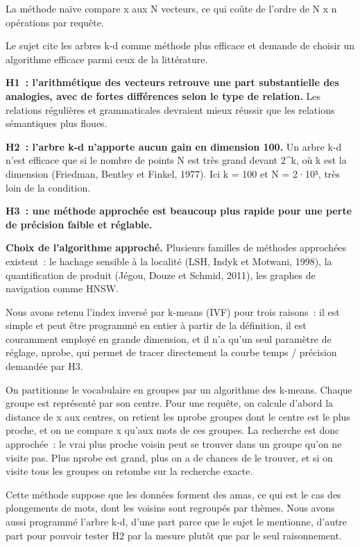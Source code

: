 \documentclass[11pt,a4paper]{article}
\begin{document}
La méthode naïve compare x aux N vecteurs, ce qui coûte de l’ordre de N x n opérations par requête.

Le sujet cite les arbres k-d comme méthode plus efficace et demande de choisir un algorithme efficace parmi ceux de la littérature.

\textbf{H1~: l’arithmétique des vecteurs retrouve une part substantielle des analogies, avec de fortes différences selon le type de relation.} Les relations régulières et grammaticales devraient mieux réussir que les relations sémantiques plus floues.

\textbf{H2~: l’arbre k-d n’apporte aucun gain en dimension 100.} Un arbre k-d n’est efficace que si le nombre de points N est très grand devant 2\textasciicircum{}k, où k est la dimension (Friedman, Bentley et Finkel, 1977). Ici k = 100 et N = 2·10⁵, très loin de la condition.

\textbf{H3~: une méthode approchée est beaucoup plus rapide pour une perte de précision faible et réglable.}\nopagebreak

\textbf{Choix de l’algorithme approché.} Plusieurs familles de méthodes approchées existent~: le hachage sensible à la localité (LSH, Indyk et Motwani, 1998), la quantification de produit (Jégou, Douze et Schmid, 2011), les graphes de navigation comme HNSW.

Nous avons retenu l’index inversé par k-means (IVF) pour trois raisons~: il est simple et peut être programmé en entier à partir de la définition, il est couramment employé en grande dimension, et il n’a qu’un seul paramètre de réglage, nprobe, qui permet de tracer directement la courbe temps / précision demandée par H3.

On partitionne le vocabulaire en groupes par un algorithme des k-means. Chaque groupe est représenté par son centre. Pour une requête, on calcule d’abord la distance de x aux centres, on retient les nprobe groupes dont le centre est le plus proche, et on ne compare x qu’aux mots de ces groupes. La recherche est donc approchée~: le vrai plus proche voisin peut se trouver dans un groupe qu’on ne visite pas. Plus nprobe est grand, plus on a de chances de le trouver, et si on visite tous les groupes on retombe sur la recherche exacte.

Cette méthode suppose que les données forment des amas, ce qui est le cas des plongements de mots, dont les voisins sont regroupés par thèmes. Nous avons aussi programmé l’arbre k-d, d’une part parce que le sujet le mentionne, d’autre part pour pouvoir tester H2 par la mesure plutôt que par le seul raisonnement.
\end{document}

